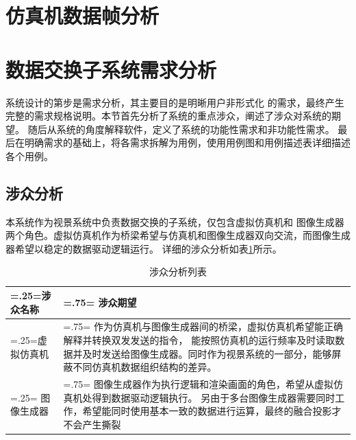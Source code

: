 \section{仿真机数据帧分析}

\section{数据交换子系统需求分析}
系统设计的第步是需求分析，其主要目的是明晰用户非形式化
的需求，最终产生完整的需求规格说明。本节首先分析了系统的重点涉众，阐述了涉众对系统的期望。
随后从系统的角度解释软件，定义了系统的功能性需求和非功能性需求。
最后在明确需求的基础上，将各需求拆解为用例，使用用例图和用例描述表详细描述各个用例。
\subsection{涉众分析}
本系统作为视景系统中负责数据交换的子系统，仅包含虚拟仿真机和
图像生成器两个角色。虚拟仿真机作为桥梁希望与仿真机和图像生成器双向交流，而图像生成器希望以稳定的数据驱动逻辑运行。
详细的涉众分析如表\ref{stakeholder}所示。
\begin{table}[h!]
    \begin{center}
        \caption{涉众分析列表}
        \label{stakeholder}
        \renewcommand\arraystretch{1.5}
        \begin{tabularx}{\textwidth}{ 
            | >{\centering\arraybackslash\hsize=.25\hsize\linewidth=\hsize}X 
            | >{\raggedright\arraybackslash\hsize=.75\hsize\linewidth=\hsize}X 
            | }
            \hline
            \textbf{涉众名称} & \textbf{涉众期望}\\
            \hline
            虚拟仿真机 &  作为仿真机与图像生成器间的桥梁，虚拟仿真机希望能正确解释并转换双发发送的指令，
                         能按照仿真机的运行频率及时读取数据并及时发送给图像生成器。同时作为视景系统的一部分，能够屏蔽不同仿真机数据组织结构的差异。\\
            \hline
            图像生成器 &  图像生成器作为执行逻辑和渲染画面的角色，希望从虚拟仿真机处得到数据驱动逻辑执行。
                          另由于多台图像生成器需要同时工作，希望能同时使用基本一致的数据进行运算，最终的融合投影才不会产生撕裂\\
            \hline
        \end{tabularx}
    \end{center}
\end{table}
